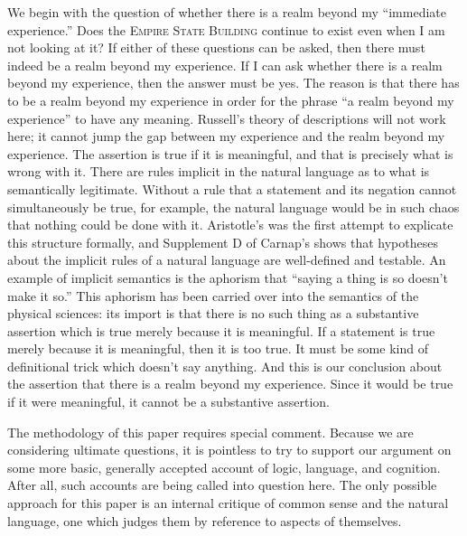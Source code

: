 
We begin with the question of whether there is a realm beyond my \enquote{immediate experience.} Does the \textsc{Empire State Building} continue to exist even when I am not looking at it? If either of these questions can be asked, then there must indeed be a realm beyond my experience. If I can ask whether there is a realm beyond my experience, then the answer must be yes. The reason is that there has to be a realm beyond my experience in order for the phrase \enquote{a realm beyond my experience} to have any meaning. Russell's theory of descriptions will not work here; it cannot jump the gap between my experience and the realm beyond my experience. The assertion  is true if it is meaningful, and that is precisely what is wrong with it. There are rules implicit in the natural language as to what is semantically legitimate. Without a rule that a statement and its negation cannot simultaneously be true, for example, the natural language would be in such chaos that nothing could be done with it. Aristotle's  was the first attempt to explicate this structure formally, and Supplement D of Carnap's  shows that hypotheses about the implicit rules of a natural language are well-defined and testable. An example of implicit semantics is the aphorism that \enquote{saying a thing is so doesn't make it so.} This aphorism has been carried over into the semantics of the physical sciences: its import is that there is no such thing as a substantive assertion which is true merely because it is meaningful. If a statement is true merely because it is meaningful, then it is too true. It must be some kind of definitional trick which doesn't say anything. And this is our conclusion about the assertion that there is a realm beyond my experience. Since it would be true if it were meaningful, it cannot be a substantive assertion. 

The methodology of this paper requires special comment. Because we are considering ultimate questions, it is pointless to try to support our argument on some more basic, generally accepted account of logic, language, and cognition. After all, such accounts are being called into question here. The only possible approach for this paper is an internal critique of common sense and the natural language, one which judges them by reference to aspects of themselves. 

